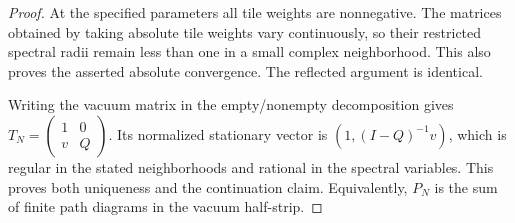 \begin{proof}
At the specified parameters all tile weights are nonnegative. The
matrices obtained by taking absolute tile weights vary continuously,
so their restricted spectral radii remain less than one in a small
complex neighborhood. This also proves the asserted absolute
convergence. The reflected argument is identical.

Writing the vacuum matrix in the empty/nonempty decomposition gives
$T_N=\left(\begin{smallmatrix}1&0\\v&Q\end{smallmatrix}\right)$.
Its normalized stationary vector is $(1,(I-Q)^{-1}v)$, which is regular
in the stated neighborhoods and rational in the spectral variables.
This proves both uniqueness and the continuation claim. Equivalently,
$P_N$ is the sum of finite path diagrams in the vacuum half-strip.
\end{proof}


